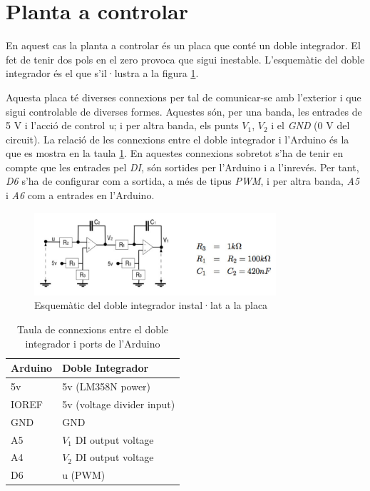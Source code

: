 \documentclass[12pt,a4paper,final,twoside,openright]{report}
\begin{document}
\section{Planta a controlar}

En aquest cas la planta a controlar és un placa que conté un doble integrador. El fet de tenir dos pols en el zero provoca que sigui inestable. L'esquemàtic del doble integrador és el que s'il·lustra a la figura \ref{fig:doble_int_scheme}.

 Aquesta placa té diverses connexions per tal de comunicar-se amb l'exterior i que sigui controlable de diverses formes. Aquestes són, per una banda, les entrades de 5 V i l'acció de control \textit{u}; i per altra banda, els punts $V_1$, $V_2$ i el \textit{GND} (0 V del circuit). La relació de les connexions entre el doble integrador i l'Arduino és la que es mostra en la taula \ref{tab:con_DI_Ard}. En aquestes connexions sobretot s'ha de tenir en compte que les entrades pel \textit{DI}, són sortides per l'Arduino i a l'inrevés. Per tant, \textit{D6} s'ha de configurar com a sortida, a més de tipus \textit{PWM}, i per altra banda, \textit{A5} i \textit{A6} com a entrades en l'Arduino.

\begin{figure}[h]
\centering
\includegraphics[width=0.8\textwidth]{Imatges/circuit_scheme.png}
\caption{Esquemàtic del doble integrador instal·lat a la placa \label{fig:doble_int_scheme}}
\end{figure}

\begin{table}[h]
\begin{center}
\begin{tabular}{l|l}
Arduino & Doble Integrador\\
\hline
5v & 5v (LM358N power)\\
IOREF & 5v (voltage divider input)\\
GND & GND\\
A5 & $V_1$ DI output voltage\\
A4 & $V_2$ DI output voltage\\
D6 & u (PWM)
\end{tabular}
\caption{Taula de connexions entre el doble integrador i ports de l'Arduino \label{tab:con_DI_Ard}}
\end{center}
\end{table}
\end{document}
